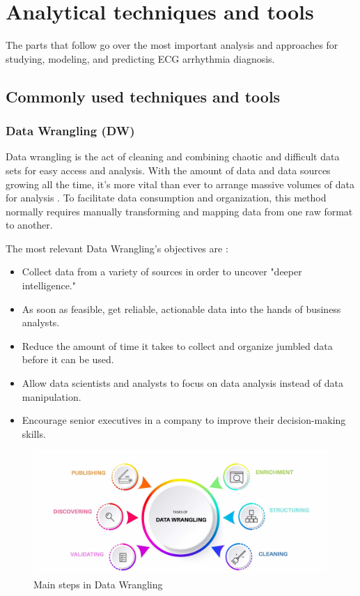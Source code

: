 \chapter{Analytical techniques and tools} \label{chap4}

The parts that follow go over the most important analysis and approaches for studying, modeling, and predicting ECG arrhythmia diagnosis.

\section{Commonly used techniques and tools} \label{4commontools}

\subsection{Data Wrangling (DW)} \label{4dw}

Data wrangling is the act of cleaning and combining chaotic and difficult data sets for easy access and analysis. With the amount of data and data sources growing all the time, it's more vital than ever to arrange massive volumes of data for analysis \cite{datawrang}. To facilitate data consumption and organization, this method normally requires manually transforming and mapping data from one raw format to another.

The most relevant Data Wrangling's objectives are \cite{datawrang}:

\begin{itemize}
    \item Collect data from a variety of sources in order to uncover "deeper intelligence."
    \item As soon as feasible, get reliable, actionable data into the hands of business analysts.
    \item Reduce the amount of time it takes to collect and organize jumbled data before it can be used.
    \item Allow data scientists and analysts to focus on data analysis instead of data manipulation.
    \item Encourage senior executives in a company to improve their decision-making skills.
\end{itemize}

\begin{figure}[H]
\centering
\includegraphics[scale=0.20]{img/DATA_WRANGLING.jpg}
\caption{Main steps in Data Wrangling}
\label{fig:dwprocess}
\end{figure}

